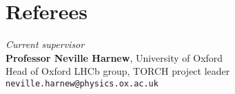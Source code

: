 \documentclass[11pt,a4paper]{article}
\newcommand\VRule{\color{lightgray}\vrule width 0.5pt}
\begin{document}


\section*{Referees}

\indent\textit{Current supervisor}\\
\textbf{Professor Neville Harnew}, University of Oxford\\
Head of Oxford LHCb group, TORCH project leader\\
\texttt{neville.harnew@physics.ox.ac.uk}\\[5pt]
\end{document}
